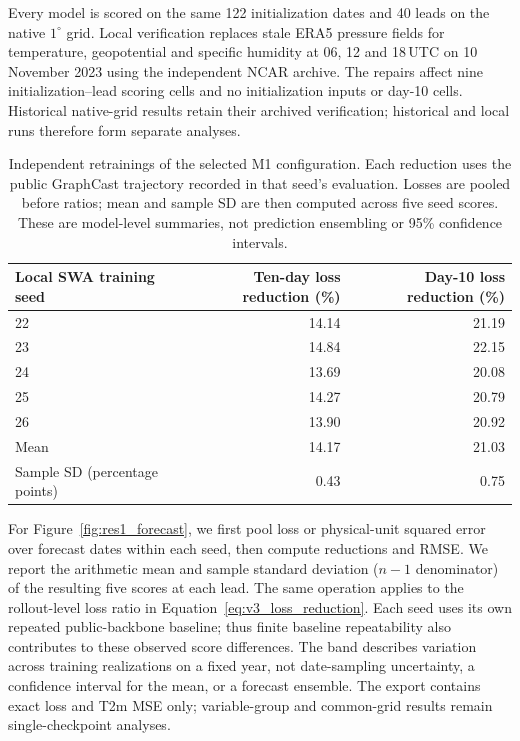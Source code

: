 \documentclass{article}
\newcommand{\vfourchange}[1]{{\color{blue}#1}}
\begin{document}
\vfourchange{Every model is scored on the same 122 initialization dates and 40 leads on the native $1^\circ$ grid. Local verification replaces stale ERA5 pressure fields for temperature, geopotential and specific humidity at 06, 12 and 18\,UTC on 10 November 2023 using the independent NCAR archive. The repairs affect nine initialization--lead scoring cells and no initialization inputs or day-10 cells. Historical native-grid results retain their archived verification; historical and local runs therefore form separate analyses.}

\begin{table}[!htbp]
    \centering
    \small
    \begingroup\color{blue}
    \begin{tabular}{lrr}
        \toprule
        Local SWA training seed & Ten-day loss reduction (\%) & Day-10 loss reduction (\%) \\
        \midrule
        22 & 14.14 & 21.19 \\
        23 & 14.84 & 22.15 \\
        24 & 13.69 & 20.08 \\
        25 & 14.27 & 20.79 \\
        26 & 13.90 & 20.92 \\
        \midrule
        Mean & 14.17 & 21.03 \\
        Sample SD (percentage points) & 0.43 & 0.75 \\
        \bottomrule
    \end{tabular}
    \endgroup
    \caption{\vfourchange{Independent retrainings of the selected M1 configuration. Each reduction uses the public GraphCast trajectory recorded in that seed's evaluation. Losses are pooled before ratios; mean and sample SD are then computed across five seed scores. These are model-level summaries, not prediction ensembling or 95\% confidence intervals.}}
    \label{tab:seed_replication}
\end{table}

\vfourchange{For Figure~\ref{fig:res1_forecast}, we first pool loss or physical-unit squared error over forecast dates within each seed, then compute reductions and RMSE. We report the arithmetic mean and sample standard deviation ($n-1$ denominator) of the resulting five scores at each lead. The same operation applies to the rollout-level loss ratio in Equation~\ref{eq:v3_loss_reduction}. Each seed uses its own repeated public-backbone baseline; thus finite baseline repeatability also contributes to these observed score differences. The band describes variation across training realizations on a fixed year, not date-sampling uncertainty, a confidence interval for the mean, or a forecast ensemble. The export contains exact loss and T2m MSE only; variable-group and common-grid results remain single-checkpoint analyses.}
\end{document}

